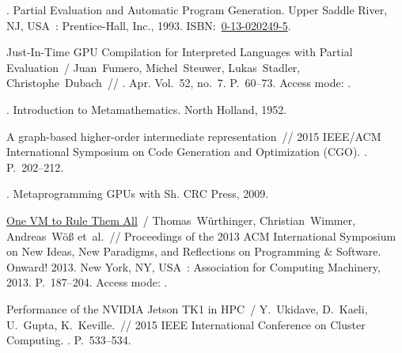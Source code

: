 \begin{thebibliography}{10}
  . Partial Evaluation
    and Automatic Program Generation. \BibDash
  \newblock Upper Saddle River, NJ, USA~: Prentice-Hall, Inc., 1993. \BibDash
  \newblock
    ISBN:~\href{http://isbndb.com/search-all.html?kw=0-13-020249-5}{0-13-020249-5}.
  
  Just-In-Time GPU Compilation for Interpreted Languages with Partial
    Evaluation~/ Juan~Fumero, Michel~Steuwer, Lukas~Stadler, Christophe~Dubach~//
    \href{http://dx.doi.org/10.1145/3140607.3050761}{}
    \BibDash
  . \BibDash Apr. \BibDash
  \newblock Vol.~52, no.~7. \BibDash
  \newblock P.~60–73. \BibDash
  \newblock Access mode: .
  
  . Introduction to Metamathematics. \BibDash
  \newblock North Holland, 1952.
  
   A graph-based higher-order
    intermediate representation~// 2015 IEEE/ACM International Symposium on Code
    Generation and Optimization (CGO). \BibDash
  . \BibDash
  \newblock P.~202--212.
  
  . Metaprogramming GPUs with Sh.
    \BibDash
  \newblock CRC Press, 2009.
  
  \href{http://dx.doi.org/10.1145/2509578.2509581}{One VM to Rule Them All}~/
    Thomas~W\"{u}rthinger, Christian~Wimmer, Andreas~W\"{o}\ss{} et~al.~//
    Proceedings of the 2013 ACM International Symposium on New Ideas, New
    Paradigms, and Reflections on Programming \& Software. \BibDash
  \newblock Onward! 2013. \BibDash
  \newblock New York, NY, USA~: Association for Computing Machinery, 2013.
    \BibDash
  \newblock P.~187–204. \BibDash
  \newblock Access mode: .
  
  Performance of the NVIDIA Jetson TK1 in HPC~/ Y.~{Ukidave}, D.~{Kaeli},
    U.~{Gupta}, K.~{Keville.}~// 2015 IEEE International Conference on Cluster
    Computing. \BibDash
  . \BibDash
  \newblock P.~533--534.
  

\end{thebibliography}
